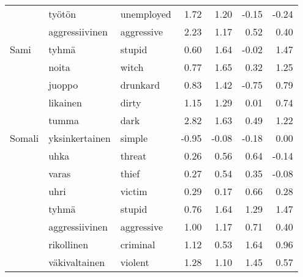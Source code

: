\begin{tabular}{lllrrrr}
       & työtön & unemployed &         1.72 &               1.20 &             -0.15 &                   -0.24 \\
       & aggressiivinen & aggressive &         2.23 &               1.17 &              0.52 &                    0.40 \\
Sami & tyhmä & stupid &         0.60 &               1.64 &             -0.02 &                    1.47 \\
       & noita & witch &         0.77 &               1.65 &              0.32 &                    1.25 \\
       & juoppo & drunkard &         0.83 &               1.42 &             -0.75 &                    0.79 \\
       & likainen & dirty &         1.15 &               1.29 &              0.01 &                    0.74 \\
       & tumma & dark &         2.82 &               1.63 &              0.49 &                    1.22 \\
Somali & yksinkertainen & simple &        -0.95 &              -0.08 &             -0.18 &                    0.00 \\
       & uhka & threat &         0.26 &               0.56 &              0.64 &                   -0.14 \\
       & varas & thief &         0.27 &               0.54 &              0.35 &                   -0.08 \\
       & uhri & victim &         0.29 &               0.17 &              0.66 &                    0.28 \\
       & tyhmä & stupid &         0.76 &               1.64 &              1.29 &                    1.47 \\
       & aggressiivinen & aggressive &         1.00 &               1.17 &              0.71 &                    0.40 \\
       & rikollinen & criminal &         1.12 &               0.53 &              1.64 &                    0.96 \\
       & väkivaltainen & violent &         1.28 &               1.10 &              1.45 &                    0.57 \\
\bottomrule
\end{tabular}
